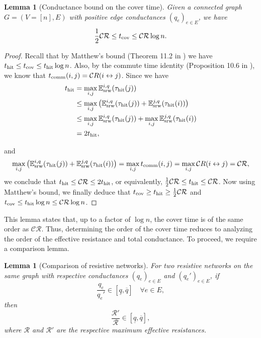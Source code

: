 \documentclass[a4paper, 11pt]{article}
\newcommand{\E}{\mathbb{E}}
\newcommand{\Esrw}{\E_{\textnormal{srw}}}
\newcommand{\cov}{\textnormal{cov}}
\newcommand{\hit}{\textnormal{hit}}
\newcommand{\comm}{\textnormal{comm}}
\newcommand{\mc}{\mathcal{C}}
\newcommand{\mr}{\mathcal{R}}
\newtheorem{lem}[thm]{Lemma}
\begin{document}
\vspace{.3em}
\begin{lem}[Conductance bound on the cover time]
\label{lem:cond_cover}
Given a connected graph $G=(V=[n], E)$ with positive edge conductances $(q_e)_{e\in E}$, we have
\[\frac{1}{2}\mc\mr\leq t_\cov\leq \mc\mr \log n.\]
\end{lem}
\begin{proof}
Recall that by Matthew's bound (Theorem 11.2 in \cite{lp}) we have $t_\hit\leq t_\cov\leq t_\hit\log n$. Also, by the commute time identity (Proposition 10.6 in \cite{lp}), we know that $t_\comm(i,j)=\mc R(i\leftrightarrow j)$. Since we have
\begin{align*}
t_\hit
&=\max_{i,j}\Esrw^{i,q}(\tau_\hit(j))\\
&\leq \max_{i,j}\big(\Esrw^{i,q}(\tau_\hit(j))+\Esrw^{j,q}(\tau_\hit(i))\big)\\
&\leq \max_{i,j}\Esrw^{i,q}(\tau_\hit(j))+\max_{i,j}\Esrw^{j,q}(\tau_\hit(i))\\
&=2t_\hit,
\end{align*}

and 
\[\max_{i,j}\big(\Esrw^{i,q}(\tau_\hit(j))+\Esrw^{j,q}(\tau_\hit(i))\big)=\max_{i,j}t_\comm(i,j)=\max_{i,j}\mc R(i\leftrightarrow j)=\mc\mr,\]
we conclude that $t_\hit\leq \mc\mr\leq 2t_\hit$, or equivalently, $\frac{1}{2}\mc\mr\leq t_\hit\leq \mc\mr$. Now using Matthew's bound, we finally deduce that $t_\cov\geq t_\hit\geq \frac{1}{2}\mc\mr$ and $t_\cov\leq t_\hit\log n\leq \mc\mr\log n$.
\end{proof}

This lemma states that, up to a factor of \( \log n \), the cover time is of the same order as \( \mathcal{C} \mathcal{R} \). Thus, determining the order of the cover time reduces to analyzing the order of the effective resistance and total conductance. To proceed, we require a comparison lemma.

\vspace{.3em}
\begin{lem}[Comparison of resistive networks]
\label{lem:comp_res}
For two resistive networks on the same graph with respective conductances \( (q_e)_{e \in E} \) and \( (q_e')_{e \in E} \), if
\[
\frac{q_e}{q_e'} \in [\underline{q}, \overline{q}] \quad \forall e \in E,
\]
then
\[
\frac{\mathcal{R}'}{\mathcal{R}} \in [\underline{q}, \overline{q}],
\]
where \( \mathcal{R} \) and \( \mathcal{R}' \) are the respective maximum effective resistances.
\end{lem}
\end{document}
